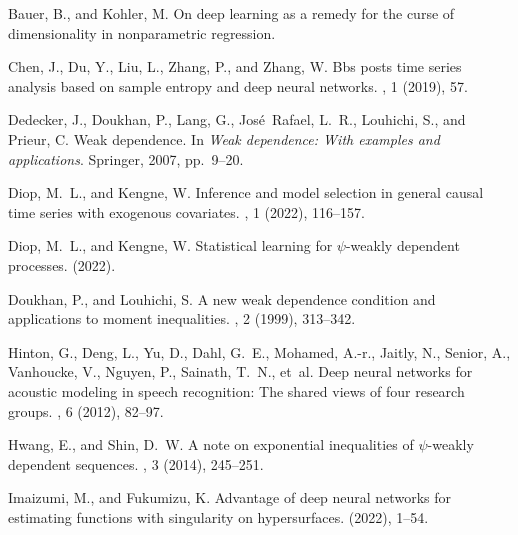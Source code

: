 \documentclass[10pt,twoside]{article}
\numberwithin{equation}{section}
\begin{document}
 
 \begin{thebibliography}{10}

{\sc Bauer, B., and Kohler, M.}
\newblock On deep learning as a remedy for the curse of dimensionality in
  nonparametric regression.

{\sc Chen, J., Du, Y., Liu, L., Zhang, P., and Zhang, W.}
\newblock Bbs posts time series analysis based on sample entropy and deep
  neural networks.
, 1 (2019), 57.

{\sc Dedecker, J., Doukhan, P., Lang, G., Jos{\'e}~Rafael, L.~R., Louhichi, S.,
  and Prieur, C.}
\newblock Weak dependence.
\newblock In {\em Weak dependence: With examples and applications}. Springer,
  2007, pp.~9--20.

{\sc Diop, M.~L., and Kengne, W.}
\newblock Inference and model selection in general causal time series with
  exogenous covariates.
, 1 (2022), 116--157.

{\sc Diop, M.~L., and Kengne, W.}
\newblock Statistical learning for $\psi $-weakly dependent processes.
 (2022).

{\sc Doukhan, P., and Louhichi, S.}
\newblock A new weak dependence condition and applications to moment
  inequalities.
, 2 (1999),
  313--342.

{\sc Hinton, G., Deng, L., Yu, D., Dahl, G.~E., Mohamed, A.-r., Jaitly, N.,
  Senior, A., Vanhoucke, V., Nguyen, P., Sainath, T.~N., et~al.}
\newblock Deep neural networks for acoustic modeling in speech recognition: The
  shared views of four research groups.
, 6 (2012), 82--97.

{\sc Hwang, E., and Shin, D.~W.}
\newblock A note on exponential inequalities of $\psi$-weakly dependent
  sequences.
, 3
  (2014), 245--251.

{\sc Imaizumi, M., and Fukumizu, K.}
\newblock Advantage of deep neural networks for estimating functions with
  singularity on hypersurfaces.
 (2022), 1--54.


\end{thebibliography}
\end{document}
